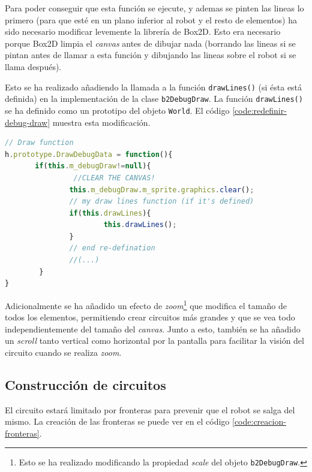 Para poder conseguir que esta función se ejecute, y ademas se pinten las lineas lo primero (para que esté en un plano inferior al robot y el resto de elementos) ha sido necesario modificar levemente la librería de Box2D. Esto era necesario porque Box2D limpia el \emph{canvas} antes de dibujar nada (borrando las lineas si se pintan antes de llamar a esta función y dibujando las lineas sobre el robot si se llama después). 

Esto se ha realizado añadiendo la llamada a la función \texttt{drawLines()} (si ésta está definida) en la implementación de la clase \texttt{b2DebugDraw}. La función \texttt{drawLines()} se ha definido como un prototipo del objeto \texttt{World}. El código \ref{code:redefinir-debug-draw} muestra esta modificación.

\begin{lstlisting}[language={Javascript},label={code:redefinir-debug-draw}, caption={Modificación de la librería de Box2D para poder dibujar de manera correcta las lineas.}]
// Draw function 
h.prototype.DrawDebugData = function(){ 
	   if(this.m_debugDraw!=null){
	   			//CLEAR THE CANVAS!
			   this.m_debugDraw.m_sprite.graphics.clear(); 
			   // my draw lines function (if it's defined)
			   if(this.drawLines){
					   this.drawLines();
			   }
			   // end re-defination
			   //(...)
		}
}
\end{lstlisting}

Adicionalmente se ha añadido un efecto de \emph{zoom}\footnote{Esto se ha realizado modificando la propiedad \emph{scale} del objeto \texttt{b2DebugDraw}.} que modifica el tamaño de todos los elementos, permitiendo crear circuitos más grandes y que se vea todo independientemente del tamaño del \emph{canvas}. Junto a esto, también se ha añadido un \emph{scroll} tanto vertical como horizontal por la pantalla para facilitar la visión del circuito cuando se realiza \emph{zoom}.



\subsection{Construcción de circuitos}
\label{sec:construccion-circuitos}

El circuito estará limitado por fronteras para prevenir que el robot se salga del mismo. La creación de las fronteras se puede ver en el código \ref{code:creacion-fronteras}.

